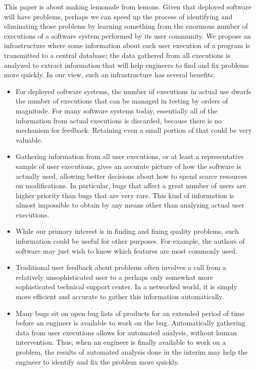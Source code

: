 This paper is about making lemonade from lemons.  Given that deployed
software will have problems, perhaps we can speed up the process of
identifying and eliminating those problems by learning something
from the enormous number of executions of a software system performed
by its user community.  We propose an infrastructure where 
some information about each user execution of a program is 
transmitted to a central database; the data 
gathered from all executions is analyzed to extract information
that will help engineers to find and fix problems more quickly.
In our view, such an infrastructure has several benefits:
\begin{itemize}

\item For deployed software systems, the number of executions
in actual use dwarfs the number of executions that can be managed in
testing by orders of magnitude.  For many software systems today,
essentially all of the information from actual executions is
discarded, because there is no mechanism for feedback.  Retaining
even a small portion of that could be very valuable.

\item Gathering information from all user executions, or at
least a representative sample of user executions, gives an
accurate picture of how the software is actually used,
allowing better decisions about how to spend scarce resources
on modifications. In particular, bugs that affect a great number
of users are higher priority than bugs that are very rare.
This kind of information is almost impossible to obtain by
any means other than analyzing actual user executions.

\item While our primary interest is in finding and fixing quality
problems, such information could be useful for other purposes.
For example, the authors of software may just wish to know which
features are most commonly used.

\item Traditional user feedback about problems often involves a call 
from a relatively unsophisticated user to a perhaps only somewhat
more sophisticated technical support center.  In a networked world,
it is simply more efficient and accurate to gather this information
automatically.

\item Many bugs sit on open bug lists of products for an extended
period of time before an engineer is available to work on the bug.
Automatically gathering data from user executions allows for automated
analysis, without human intervention.  Thus, when an engineer is
finally available to work on a problem, the results of automated
analysis done in the interim may help the engineer to identify and fix
the problem more quickly.


\end{itemize}
